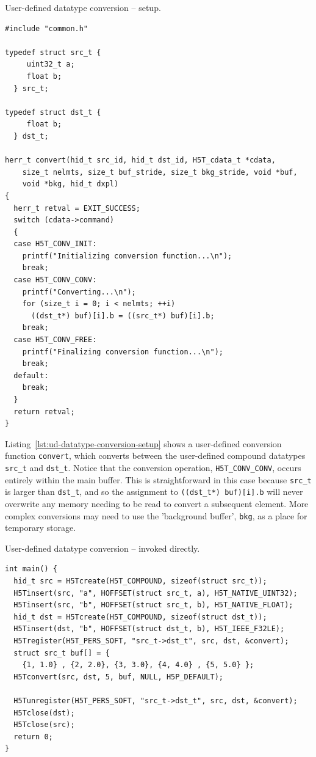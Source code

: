 \begin{listing}
\centering
\caption{User-defined datatype conversion -- setup.}
\label{lst:ud-datatype-conversion-setup}
\begin{verbatim}
#include "common.h"

typedef struct src_t {
     uint32_t a;
     float b;
  } src_t;

typedef struct dst_t {
     float b;
  } dst_t;

herr_t convert(hid_t src_id, hid_t dst_id, H5T_cdata_t *cdata,
    size_t nelmts, size_t buf_stride, size_t bkg_stride, void *buf,
    void *bkg, hid_t dxpl)
{
  herr_t retval = EXIT_SUCCESS;
  switch (cdata->command)
  {
  case H5T_CONV_INIT:
    printf("Initializing conversion function...\n");
    break;
  case H5T_CONV_CONV:
    printf("Converting...\n");
    for (size_t i = 0; i < nelmts; ++i)
      ((dst_t*) buf)[i].b = ((src_t*) buf)[i].b;
    break;
  case H5T_CONV_FREE:
    printf("Finalizing conversion function...\n");
    break;
  default:
    break;
  }
  return retval;
}
\end{verbatim}
\end{listing}

Listing~\ref{lst:ud-datatype-conversion-setup} shows a user-defined conversion function \texttt{convert}, which converts between the user-defined compound datatypes \texttt{src\_t} and \texttt{dst\_t}. Notice that the conversion operation, \texttt{H5T\_CONV\_CONV}, occurs entirely within the main buffer. This is straightforward in this case because \texttt{src\_t} is larger than \texttt{dst\_t}, and so the assignment to \texttt{((dst\_t*) buf)[i].b} will never overwrite any memory needing to be read to convert a subsequent element. More complex conversions may need to use the 'background buffer', \texttt{bkg}, as a place for temporary storage.

\begin{listing}
\centering
\caption{User-defined datatype conversion -- invoked directly.}
\label{lst:ud-datatype-conversion-direct}
\begin{verbatim}
int main() {
  hid_t src = H5Tcreate(H5T_COMPOUND, sizeof(struct src_t));
  H5Tinsert(src, "a", HOFFSET(struct src_t, a), H5T_NATIVE_UINT32);
  H5Tinsert(src, "b", HOFFSET(struct src_t, b), H5T_NATIVE_FLOAT);
  hid_t dst = H5Tcreate(H5T_COMPOUND, sizeof(struct dst_t));
  H5Tinsert(dst, "b", HOFFSET(struct dst_t, b), H5T_IEEE_F32LE);
  H5Tregister(H5T_PERS_SOFT, "src_t->dst_t", src, dst, &convert);
  struct src_t buf[] = {
    {1, 1.0} , {2, 2.0}, {3, 3.0}, {4, 4.0} , {5, 5.0} };  
  H5Tconvert(src, dst, 5, buf, NULL, H5P_DEFAULT);
  
  H5Tunregister(H5T_PERS_SOFT, "src_t->dst_t", src, dst, &convert); 
  H5Tclose(dst);
  H5Tclose(src);
  return 0;
}
\end{verbatim}
\end{listing}

